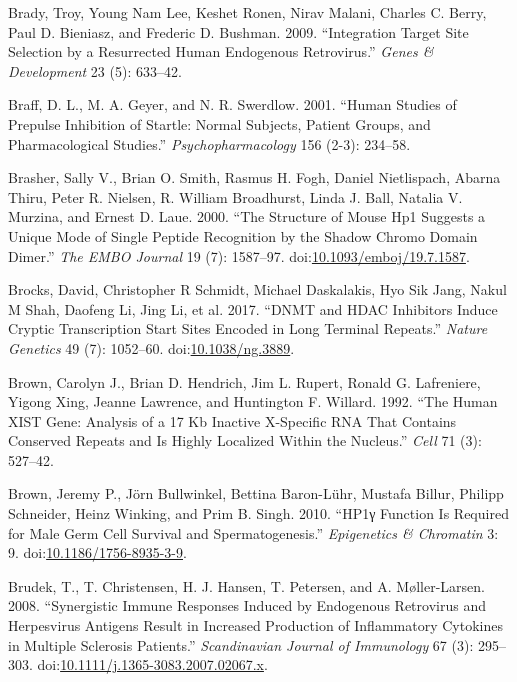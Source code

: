 \documentclass[onehalf,12pt]{beavtex}
\begin{document}
  \hypertarget{ref-BradyIntegrationtargetsite2009}{}
  Brady, Troy, Young Nam Lee, Keshet Ronen, Nirav Malani, Charles C.
  Berry, Paul D. Bieniasz, and Frederic D. Bushman. 2009. ``Integration
  Target Site Selection by a Resurrected Human Endogenous Retrovirus.''
  \emph{Genes \& Development} 23 (5): 633--42.
  
  \hypertarget{ref-BraffHumanstudiesprepulse2001}{}
  Braff, D. L., M. A. Geyer, and N. R. Swerdlow. 2001. ``Human Studies of
  Prepulse Inhibition of Startle: Normal Subjects, Patient Groups, and
  Pharmacological Studies.'' \emph{Psychopharmacology} 156 (2-3): 234--58.
  
  \hypertarget{ref-BrasherstructuremouseHP12000}{}
  Brasher, Sally V., Brian O. Smith, Rasmus H. Fogh, Daniel Nietlispach,
  Abarna Thiru, Peter R. Nielsen, R. William Broadhurst, Linda J. Ball,
  Natalia V. Murzina, and Ernest D. Laue. 2000. ``The Structure of Mouse
  Hp1 Suggests a Unique Mode of Single Peptide Recognition by the Shadow
  Chromo Domain Dimer.'' \emph{The EMBO Journal} 19 (7): 1587--97.
  doi:\href{https://doi.org/10.1093/emboj/19.7.1587}{10.1093/emboj/19.7.1587}.
  
  \hypertarget{ref-BrocksDNMTHDACinhibitors2017}{}
  Brocks, David, Christopher R Schmidt, Michael Daskalakis, Hyo Sik Jang,
  Nakul M Shah, Daofeng Li, Jing Li, et al. 2017. ``DNMT and HDAC
  Inhibitors Induce Cryptic Transcription Start Sites Encoded in Long
  Terminal Repeats.'' \emph{Nature Genetics} 49 (7): 1052--60.
  doi:\href{https://doi.org/10.1038/ng.3889}{10.1038/ng.3889}.
  
  \hypertarget{ref-BrownhumanXISTgene1992}{}
  Brown, Carolyn J., Brian D. Hendrich, Jim L. Rupert, Ronald G.
  Lafreniere, Yigong Xing, Jeanne Lawrence, and Huntington F. Willard.
  1992. ``The Human XIST Gene: Analysis of a 17 Kb Inactive X-Specific RNA
  That Contains Conserved Repeats and Is Highly Localized Within the
  Nucleus.'' \emph{Cell} 71 (3): 527--42.
  
  \hypertarget{ref-BrownHP1gfunctionrequired2010}{}
  Brown, Jeremy P., Jörn Bullwinkel, Bettina Baron-Lühr, Mustafa Billur,
  Philipp Schneider, Heinz Winking, and Prim B. Singh. 2010. ``HP1γ
  Function Is Required for Male Germ Cell Survival and Spermatogenesis.''
  \emph{Epigenetics \& Chromatin} 3: 9.
  doi:\href{https://doi.org/10.1186/1756-8935-3-9}{10.1186/1756-8935-3-9}.
  
  \hypertarget{ref-BrudekSynergisticimmuneresponses2008}{}
  Brudek, T., T. Christensen, H. J. Hansen, T. Petersen, and A.
  Møller-Larsen. 2008. ``Synergistic Immune Responses Induced by
  Endogenous Retrovirus and Herpesvirus Antigens Result in Increased
  Production of Inflammatory Cytokines in Multiple Sclerosis Patients.''
  \emph{Scandinavian Journal of Immunology} 67 (3): 295--303.
  doi:\href{https://doi.org/10.1111/j.1365-3083.2007.02067.x}{10.1111/j.1365-3083.2007.02067.x}.
  
\end{document}
